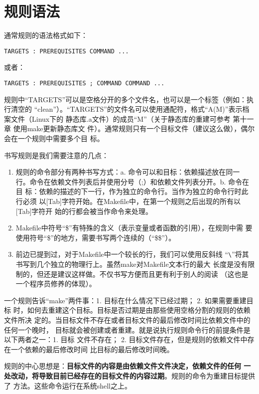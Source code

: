 \section{规则语法}
通常规则的语法格式如下：
\begin{Verbatim}[]
TARGETS : PREREQUISITES COMMAND ...
\end{Verbatim}
或者：
\begin{Verbatim}[]
TARGETS : PREREQUISITES ; COMMAND COMMAND ...
\end{Verbatim}

规则中“TARGETS”可以是空格分开的多个文件名，也可以是一个标签（例如：执行清空的
“clean”）。“TARGETS”的文件名可以使用通配符，格式“A(M)”表示档案文件（Linux下的
静态库.a文件）的成员“M”（关于静态库的重建可参考 第十一章 使用make更新静态库文
件）。通常规则只有一个目标文件（建议这么做），偶尔会在一个规则中需要多个目
标。

书写规则是我们需要注意的几点：
\begin{enumerate}
\itemsep=0pt \parskip=0pt
 \item 规则的命令部分有两种书写方式：a. 命令可以和目标：依赖描述放在同一
     行。命令在依赖文件列表后并使用分号（;）和依赖文件列表分开。b. 命令在目
     标：依赖的描述的下一行，作为独立的命令行。当作为独立的命令行时此行必须
     以[Tab]字符开始。在Makefile中，在第一个规则之后出现的所有以[Tab]字符开
     始的行都会被当作命令来处理。
 \item Makefile中符号“\$”有特殊的含义（表示变量或者函数的引用），在规则中需
     要使用符号“\$”的地方，需要书写两个连续的（“\$\$”）。
 \item 前边已提到过，对于Makefile中一个较长的行，我们可以使用反斜线
     “\verb"\"”将其书写到几个独立的物理行上。虽然make对Makefile文本行的最大
     长度是没有限制的，但还是建议这样做。不仅书写方便而且更有利于别人的阅读
     （这也是一个程序员修养的体现）。
\end{enumerate}

一个规则告诉“make”两件事：1. 目标在什么情况下已经过期； 2. 如果需要重建目标
时，如何去重建这个目标。目标是否过期是由那些使用空格分割的规则的依赖文件所决
定的。当目标文件不存在或者目标文件的最后修改时间比依赖文件中的任何一个晚时，
目标就会被创建或者重建。就是说执行规则命令行的前提条件是以下两者之一：1. 目标
文件不存在； 2. 目标文件存在，但是规则的依赖文件中存在一个依赖的最后修改时间
比目标的最后修改时间晚。

规则的中心思想是：\textbf{目标文件的内容是由依赖文件文件决定，依赖文件的任何
一处改动，将导致目前已经存在的目标文件的内容过期}。规则的命令为重建目标提供了
方法。这些命令运行在系统shell之上。


